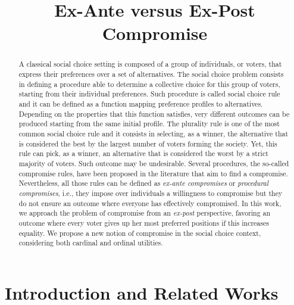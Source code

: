 \documentclass[version=3.21, pagesize, notitlepage, twoside=off, bibliography=totoc, DIV=calc, fontsize=12pt, a4paper]{scrartcl}
\title{Ex-Ante versus Ex-Post \\ Compromise}
\author{}
\date{}
\begin{document}
\maketitle
\thispagestyle{empty}

\begin{abstract}
	A classical social choice setting is composed of a group of individuals, or voters, that express their preferences over a set of alternatives. The social choice problem consists in defining a procedure able to determine a collective choice for this group of voters, starting from their individual preferences. Such procedure is called social choice rule and it can be defined as a function mapping preference profiles to alternatives. Depending on the properties that this function satisfies, very different outcomes can be produced starting from the same initial profile. The plurality rule is one of the most common social choice rule and it consists in selecting, as a winner, the alternative that is considered the best by the largest number of voters forming the society. Yet, this rule can pick, as a winner, an alternative that is considered the worst by a strict majority of voters. Such outcome may be undesirable. Several procedures, the so-called compromise rules, have been proposed in the literature that aim to find a compromise. Nevertheless, all those rules can be defined as \textit{ex-ante compromises} or \textit{procedural compromises}, i.e., they impose over individuals a willingness to compromise but they do not ensure an outcome where everyone has effectively compromised. In this work, we approach the problem of compromise from an \textit{ex-post} perspective, favoring an outcome where every voter gives up her most preferred positions if this increases equality. We propose a new notion of compromise in the social choice context, considering both cardinal and ordinal utilities. 
\end{abstract}

\pagebreak

\section{Introduction and Related Works}
\end{document}
